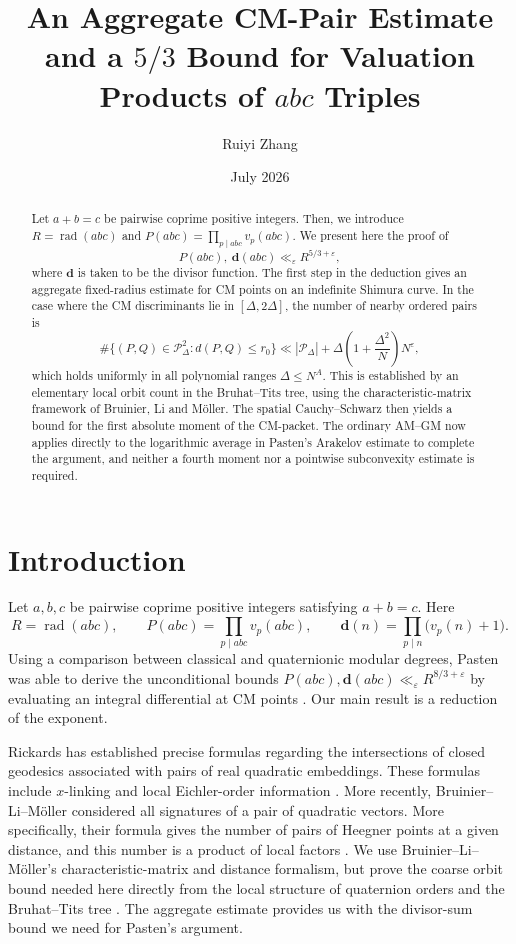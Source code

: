 \documentclass[11pt,reqno]{amsart}
\title[The $5/3$ valuation bound for $abc$ triples]{An Aggregate CM-Pair Estimate and a $5/3$ Bound for Valuation Products of $abc$ Triples}
\author{Ruiyi Zhang}
\date{July 2026}
\theoremstyle{definition}
\newcommand{\rad}{\operatorname{rad}}
\newcommand{\dd}{\mathbf d}
\newcommand{\eps}{\varepsilon}
\begin{document}
\begin{abstract}

Let $a+b=c$ be pairwise coprime positive integers. Then, we introduce $R=\rad(abc)$ and $P(abc)=\prod_{p\mid abc}v_p(abc)$. We present here the proof of \[
 P(abc),\ \dd(abc)\ll_{\eps}R^{5/3+\eps},
\]
where $\dd$ is taken to be the divisor function. The first step in the deduction gives an aggregate fixed-radius estimate for CM points on an indefinite Shimura curve. In the case where the CM discriminants lie in $[\Delta,2\Delta]$, the number of nearby ordered pairs is \[
 \#\{(P,Q)\in\mathscr P_\Delta^2:d(P,Q)\leq r_0\}
 \ll |\mathscr P_\Delta|+
 \Delta\left(1+\frac{\Delta^2}{N}\right)N^\eps,
\]
which holds uniformly in all polynomial ranges $\Delta\leq N^A$. This is established by an elementary local orbit count in the Bruhat--Tits tree, using the characteristic-matrix framework of Bruinier, Li and M\"oller. The spatial Cauchy--Schwarz then yields a bound for the first absolute moment of the CM-packet. The ordinary AM--GM now applies directly to the logarithmic average in Pasten's Arakelov estimate to complete the argument, and neither a fourth moment nor a pointwise subconvexity estimate is required.

\end{abstract}
\maketitle
\pagestyle{plain}


\newpage

\section{Introduction}

Let $a,b,c$ be pairwise coprime positive integers satisfying $a+b=c$. Here \[
 R=\rad(abc),\qquad
 P(abc)=\prod_{p\mid abc}v_p(abc),\qquad
 \dd(n)=\prod_{p\mid n}\bigl(v_p(n)+1\bigr).
\] Using a comparison between classical and quaternionic modular degrees,
Pasten was able to derive the unconditional bounds $P(abc),\dd(abc)\ll_\eps R^{8/3+\eps}$
by evaluating an integral differential at CM points \cite[Theorem 1.11 and
Theorem 16.8]{Pasten}. 
Our main result is a reduction of the exponent.

Rickards has established precise formulas regarding the intersections of
closed geodesics associated with pairs of real quadratic embeddings. These formulas include $x$-linking and local Eichler-order information
\cite[Theorems 10 and 63]{Rickards}. More recently, Bruinier--Li--M\"oller considered all signatures of a pair of
quadratic vectors. More specifically, their formula gives the number of pairs of Heegner points
at a given distance, and this number is a product of local factors
\cite[Theorem 1.1(iv) and Corollary 5.9]{BruinierLiMoller}. We use Bruinier--Li--M\"oller's characteristic-matrix and distance
formalism, but prove the coarse orbit bound needed here directly from the
local structure of quaternion orders and the Bruhat--Tits tree
\cite[Equation (23.2.4), Theorem 13.3.11, and Sections
23.5.11--23.5.16]{Voight}. The aggregate estimate provides us with the divisor-sum bound we need for
Pasten's argument.
\end{document}
